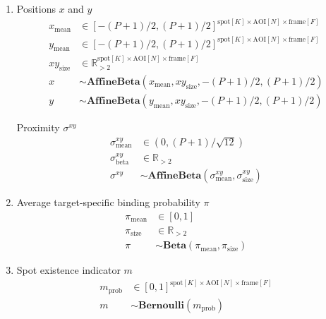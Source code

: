 \begin{enumerate}
\item Positions $x$ and $y$
\begin{subequations}
\begin{align}
    x_\mathrm{mean} &\in [-(P+1)/2, (P+1)/2]^{\mathrm{spot}[K] \times \mathrm{AOI}[N] \times \mathrm{frame}[F]} \\
    y_\mathrm{mean} &\in [-(P+1)/2, (P+1)/2]^{\mathrm{spot}[K] \times \mathrm{AOI}[N] \times \mathrm{frame}[F]} \\
    xy_\mathrm{size} &\in \mathbb{R}_{>2}^{\mathrm{spot}[K] \times \mathrm{AOI}[N] \times \mathrm{frame}[F]} \\
    x &\sim \mathbf{AffineBeta} \left( x_\mathrm{mean}, xy_\mathrm{size}, -(P+1)/2, (P+1)/2 \right) \\
    y &\sim \mathbf{AffineBeta} \left( y_\mathrm{mean}, xy_\mathrm{size}, -(P+1)/2, (P+1)/2 \right)
\end{align}
\end{subequations}

Proximity $\sigma^{xy}$
\begin{subequations}
\begin{align}
    \sigma^{xy}_\mathrm{mean} &\in (0, (P+1) / \sqrt{12}) \\
    \sigma^{xy}_\mathrm{beta} &\in \mathbb{R}_{>2} \\
    \sigma^{xy} &\sim \mathbf{AffineBeta}(\sigma^{xy}_\mathrm{mean}, \sigma^{xy}_\mathrm{size})
\end{align}
\end{subequations}

\item Average target-specific binding probability $\pi$
\begin{subequations}
\begin{align}
    \pi_\mathrm{mean} &\in [0, 1] \\
    \pi_\mathrm{size} &\in \mathbb{R}_{>2} \\
    \pi &\sim \mathbf{Beta}(\pi_\mathrm{mean}, \pi_\mathrm{size})
\end{align}
\end{subequations}

\item Spot existence indicator $m$
\begin{subequations}
\begin{align}
    m_\mathrm{prob} &\in [ 0, 1 ]^{\mathrm{spot}[K] \times \mathrm{AOI}[N] \times \mathrm{frame}[F]} \\
    m &\sim \mathbf{Bernoulli}(m_\mathrm{prob})
\end{align}
\end{subequations}


\end{enumerate}
